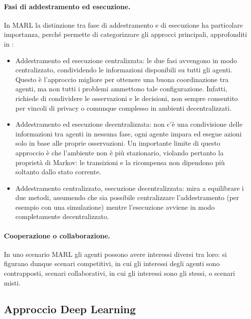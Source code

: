 \paragraph{Fasi di addestramento ed esecuzione.} In MARL la distinzione tra fase di addestramento e di esecuzione ha particolare importanza, perché permette di categorizzare gli approcci principali, approfonditi in \cite{Stefano2024}:

\begin{itemize}
    \item Addestramento ed esecuzione centralizzata: le due fasi avvengono in modo centralizzato, condividendo le informazioni disponibili su tutti gli agenti. Questo è l'approccio migliore per ottenere una buona coordinazione tra agenti, ma non tutti i problemi ammettono tale configurazione. Infatti, richiede di condividere le osservazioni e le decisioni, non sempre consentito per vincoli di privacy o comunque complesso in ambienti decentralizzati. 

    \item Addestramento ed esecuzione decentralizzata: non c'è una condivisione delle informazioni tra agenti in nessuna fase, ogni agente impara ed esegue azioni solo in base alle proprie osservazioni. Un importante limite di questo approccio è che l'ambiente non è più stazionario, violando pertanto la proprietà di Markov: le transizioni e la ricompensa non dipendono più soltanto dallo stato corrente. 

    \item Addestramento centralizzato, esecuzione decentralizzata: mira a equilibrare i due metodi, assumendo che sia possibile centralizzare l'addestramento (per esempio con una simulazione) mentre l'esecuzione avviene in modo completamente decentralizzato.
\end{itemize}

\paragraph{Cooperazione o collaborazione.} In uno scenario MARL gli agenti possono avere interessi diversi tra loro: si figurano dunque scenari competitivi, in cui gli interessi degli agenti sono contrapposti, scenari collaborativi, in cui gli interessi sono gli stessi, o scenari misti.

\subsection{Approccio Deep Learning}

